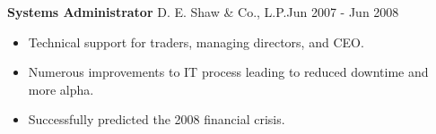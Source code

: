 \textbf{Systems Administrator}
D. E. Shaw \& Co., L.P.\hfill Jun 2007 - Jun 2008
\begin{itemize}  \itemsep -2pt %
\item Technical support for traders, managing directors, and CEO.
\item Numerous improvements to IT process leading to reduced downtime and more alpha.
\item Successfully predicted the 2008 financial crisis.

\end{itemize}
